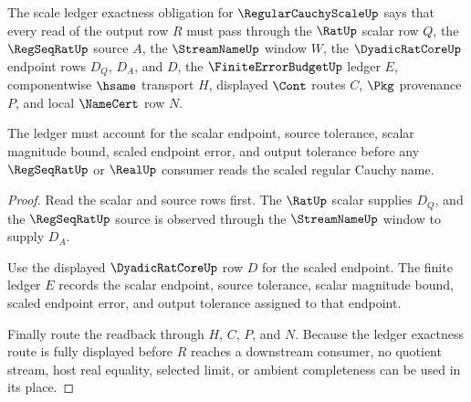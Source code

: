 \begin{theorem}
\label{thm:regularcauchyscale-ledger-exactness-obligation}
The scale ledger exactness obligation for $\RegularCauchyScaleUp$ says that every read of the output row $R$ must pass through the $\RatUp$ scalar row $Q$, the $\RegSeqRatUp$ source $A$, the $\StreamNameUp$ window $W$, the $\DyadicRatCoreUp$ endpoint rows $D_Q$, $D_A$, and $D$, the $\FiniteErrorBudgetUp$ ledger $E$, componentwise $\hsame$ transport $H$, displayed $\Cont$ routes $C$, $\Pkg$ provenance $P$, and local $\NameCert$ row $N$.

The ledger must account for the scalar endpoint, source tolerance, scalar magnitude bound, scaled endpoint error, and output tolerance before any $\RegSeqRatUp$ or $\RealUp$ consumer reads the scaled regular Cauchy name.
\end{theorem}
\begin{proof}
Read the scalar and source rows first. The $\RatUp$ scalar supplies $D_Q$, and the $\RegSeqRatUp$ source is observed through the $\StreamNameUp$ window to supply $D_A$.

Use the displayed $\DyadicRatCoreUp$ row $D$ for the scaled endpoint. The finite ledger $E$ records the scalar endpoint, source tolerance, scalar magnitude bound, scaled endpoint error, and output tolerance assigned to that endpoint.

Finally route the readback through $H$, $C$, $P$, and $N$. Because the ledger exactness route is fully displayed before $R$ reaches a downstream consumer, no quotient stream, host real equality, selected limit, or ambient completeness can be used in its place.
\end{proof}

